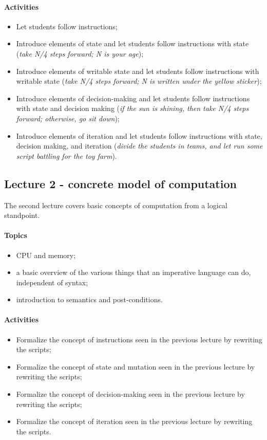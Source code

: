 \documentclass[12pt,a4paper,final]{article}
\begin{document}
\paragraph*{Activities}
\begin{itemize}
\item Let students follow instructions;
\item Introduce elements of state and let students follow instructions with state (\textit{take N/4 steps forward; N is your age});
\item Introduce elements of writable state and let students follow instructions with writable state (\textit{take N/4 steps forward; N is written under the yellow sticker});
\item Introduce elements of decision-making and let students follow instructions with state and decision making (\textit{if the sun is shining, then take N/4 steps forward; otherwise, go sit down});
\item Introduce elements of iteration and let students follow instructions with state, decision making, and iteration (\textit{divide the students in teams, and let run some script battling for the toy farm}).
\end{itemize}

\subsection{Lecture 2 - concrete model of computation}
The second lecture covers basic concepts of computation from a logical standpoint.

\paragraph*{Topics}
\begin{itemize}
\item CPU and memory;
\item a basic overview of the various things that an imperative language can do, independent of syntax;
\item introduction to semantics and post-conditions.
\end{itemize}

\paragraph*{Activities}
\begin{itemize}
\item Formalize the concept of instructions seen in the previous lecture by rewriting the scripts;
\item Formalize the concept of state and mutation seen in the previous lecture by rewriting the scripts;
\item Formalize the concept of decision-making seen in the previous lecture by rewriting the scripts;
\item Formalize the concept of iteration seen in the previous lecture by rewriting the scripts.
\end{itemize}
\end{document}
